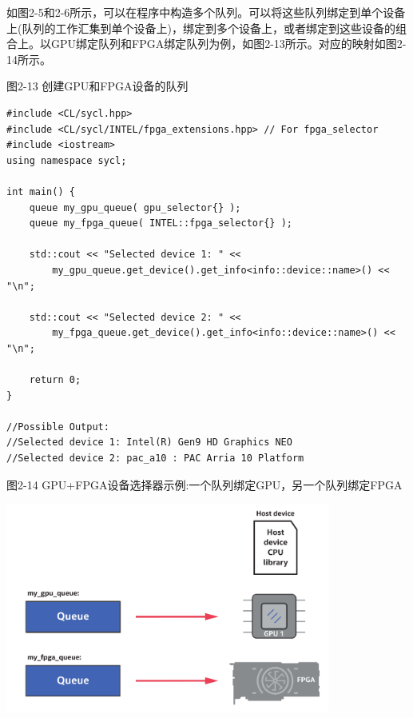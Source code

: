 如图2-5和2-6所示，可以在程序中构造多个队列。可以将这些队列绑定到单个设备上(队列的工作汇集到单个设备上)，绑定到多个设备上，或者绑定到这些设备的组合上。以GPU绑定队列和FPGA绑定队列为例，如图2-13所示。对应的映射如图2-14所示。\par

\hspace*{\fill} \par %
图2-13 创建GPU和FPGA设备的队列
\begin{lstlisting}[caption={}]
#include <CL/sycl.hpp>
#include <CL/sycl/INTEL/fpga_extensions.hpp> // For fpga_selector
#include <iostream>
using namespace sycl;

int main() {
	queue my_gpu_queue( gpu_selector{} );
	queue my_fpga_queue( INTEL::fpga_selector{} );
	
	std::cout << "Selected device 1: " <<
		my_gpu_queue.get_device().get_info<info::device::name>() << "\n";
		
	std::cout << "Selected device 2: " <<
		my_fpga_queue.get_device().get_info<info::device::name>() << "\n";
	
	return 0;
}

//Possible Output:
//Selected device 1: Intel(R) Gen9 HD Graphics NEO
//Selected device 2: pac_a10 : PAC Arria 10 Platform
\end{lstlisting}

\hspace*{\fill} \par %
图2-14 GPU+FPGA设备选择器示例:一个队列绑定GPU，另一个队列绑定FPGA
\begin{center}
	\includegraphics[width=0.8\textwidth]{content/chapter-2/images/8}
\end{center}












